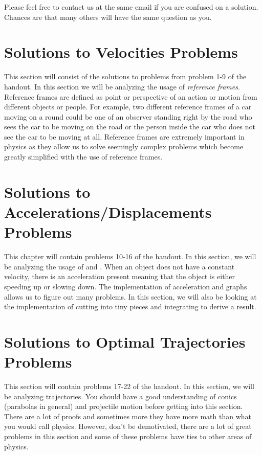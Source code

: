 \documentclass[11pt]{article}
\begin{document}
Please feel free to contact us at the same email if you are confused on a solution. Chances are that many others will have the same question as you.

\newpage
\section{Solutions to Velocities Problems}
\vspace{-5mm}
This section will consist of the solutions to problems from problem 1-9 of the handout. In this section we will be analyzing the usage of \textit{reference frames}. Reference frames are defined as point or perspective of an action or motion from different objects or people. For example, two different reference frames of a car moving on a round could be one of an observer standing right by the road who sees the car to be moving on the road or the person inside the car who does not see the car to be moving at all. Reference frames are extremely important in physics as they allow us to solve seemingly complex problems which become greatly simplified with the use of reference frames. 











\newpage
\section{Solutions to Accelerations/Displacements Problems}

This chapter will contain problems 10-16 of the handout. In this section, we will be analyzing the usage of  and . When an object does not have a constant velocity, there is an acceleration present meaning that the object is either speeding up or slowing down. The implementation of acceleration and graphs allows us to figure out many problems. In this section, we will also be looking at the implementation of cutting into tiny pieces and integrating to derive a result.









\newpage
\section{Solutions to Optimal Trajectories Problems}
This section will contain problems 17-22 of the handout. In this section, we will be analyzing trajectories. You should have a good understanding of conics (parabolas in general) and projectile motion before getting into this section. There are a lot of proofs and sometimes more they have more math than what you would call physics. However, don't be demotivated, there are a lot of great problems in this section and some of these problems have ties to other areas of physics. 
\end{document}
